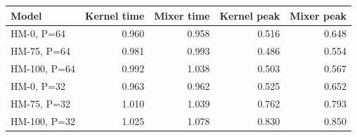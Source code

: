 \begin{tabular}{@{}lrrrr@{}}
\toprule
Model & Kernel time & Mixer time & Kernel peak & Mixer peak \\
\midrule
HM-0, P=64 & 0.960 & 0.958 & 0.516 & 0.648 \\
HM-75, P=64 & 0.981 & 0.993 & 0.486 & 0.554 \\
HM-100, P=64 & 0.992 & 1.038 & 0.503 & 0.567 \\
HM-0, P=32 & 0.963 & 0.962 & 0.525 & 0.652 \\
HM-75, P=32 & 1.010 & 1.039 & 0.762 & 0.793 \\
HM-100, P=32 & 1.025 & 1.078 & 0.830 & 0.850 \\
\bottomrule
\end{tabular}
